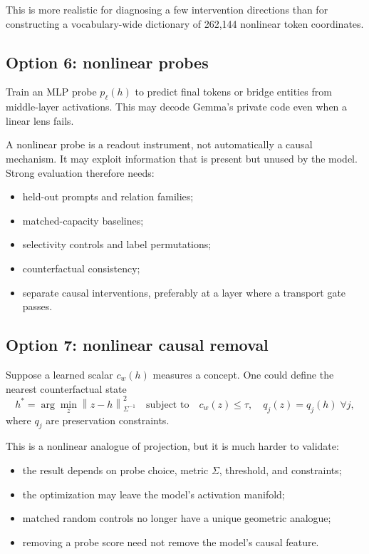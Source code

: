 \documentclass[11pt]{article}
\newcommand{\Norm}[1]{\left\lVert #1 \right\rVert}
\theoremstyle{definition}
\theoremstyle{remark}
\begin{document}
This is more realistic for diagnosing a few intervention directions than for constructing a vocabulary-wide dictionary of 262,144 nonlinear token coordinates.

\subsection{Option 6: nonlinear probes}
Train an MLP probe $p_\ell(h)$ to predict final tokens or bridge entities from middle-layer activations. This may decode Gemma's private code even when a linear lens fails.

A nonlinear probe is a readout instrument, not automatically a causal mechanism. It may exploit information that is present but unused by the model. Strong evaluation therefore needs:
\begin{itemize}
  \item held-out prompts and relation families;
  \item matched-capacity baselines;
  \item selectivity controls and label permutations;
  \item counterfactual consistency;
  \item separate causal interventions, preferably at a layer where a transport gate passes.
\end{itemize}

\subsection{Option 7: nonlinear causal removal}
Suppose a learned scalar $c_w(h)$ measures a concept. One could define the nearest counterfactual state
\begin{equation}
  h^*=\arg\min_{z}\Norm{z-h}_{\Sigma^{-1}}^2
  \quad\text{subject to}\quad
  c_w(z)\le\tau,
  \quad q_j(z)=q_j(h)\;\forall j,
  \label{eq:counterfactual_opt}
\end{equation}
where $q_j$ are preservation constraints.

This is a nonlinear analogue of projection, but it is much harder to validate:
\begin{itemize}
  \item the result depends on probe choice, metric $\Sigma$, threshold, and constraints;
  \item the optimization may leave the model's activation manifold;
  \item matched random controls no longer have a unique geometric analogue;
  \item removing a probe score need not remove the model's causal feature.
\end{itemize}
\end{document}
